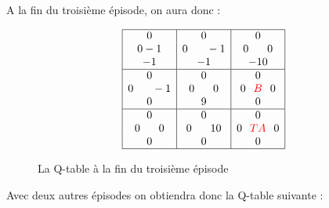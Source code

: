 A la fin du troisième épisode, on aura donc : 
\begin{figure}[!ht]
\centering
$$\begin{array}{|c|c|c|}
\hline
0                      & 0                           & 0 \\
0 -1 & 0 \hspace*{0.6cm} -1 & 0\hspace*{0.6cm}0 \\
-1          & -1          & -10 \\
\hline
0          & 0                            & 0 \\
0\hspace*{0.6cm}-1   & 0\hspace*{0.6cm} 0                  & 0\hspace*{0.25cm}\textcolor{red}{B}\hspace*{0.25cm} 0 \\
0           & 9         & 0 \\
\hline
0          & 0                         & 0\\
0\hspace*{0.6cm} 0                     & 0\hspace*{0.6cm}10                & 0\hspace*{0.25cm}\textcolor{red}{T A}\hspace*{0.25cm} 0 \\
0                            & 0        & 0 \\
\hline
\end{array}
$$
\caption{La Q-table à la fin du troisième épisode}
\end{figure}
\newpage
Avec deux autres épisodes on obtiendra donc la Q-table suivante : 

